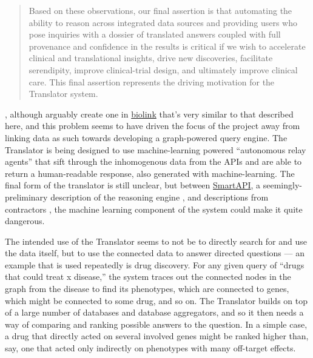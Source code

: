 \documentclass[10pt]{article}
\begin{document}
\begin{multicols}{2}
{\begin{quote}
  Based on these observations, our final assertion is that automating
  the ability to reason across integrated data sources and providing
  users who pose inquiries with a dossier of translated answers coupled
  with full provenance and confidence in the results is critical if we
  wish to accelerate clinical and translational insights, drive new
  discoveries, facilitate serendipity, improve clinical-trial design,
  and ultimately improve clinical care. This final assertion represents
  the driving motivation for the Translator system. \cite{consortiumUniversalBiomedicalData2019} 
  \end{quote}}\cite{consortiumUniversalBiomedicalData2019} ,
although arguably create one in
\href{https://biolink.github.io/biolink-model/docs/}{biolink} that's
very similar to that described here, and this problem seems to have
driven the focus of the project away from linking data as such towards
developing a graph-powered query engine. The Translator is being
designed to use machine-learning powered ``autonomous relay agents''
that sift through the inhomogenous data from the APIs and are able to
return a human-readable response, also generated with machine-learning.
The final form of the translator is still unclear, but between
\href{https://smart-api.info/portal/translator}{SmartAPI}, a
seemingly-preliminary description of the reasoning engine \cite{goelExplanationContainerCaseBased2021} , and descriptions from
contractors \cite{ROBOKOPCoVar2021} , the machine learning
component of the system could make it quite dangerous.

The intended use of the Translator seems to not be to directly search
for and use the data itself, but to use the connected data to answer
directed questions \cite{goelExplanationContainerCaseBased2021} 
--- an example that is used repeatedly is drug discovery. For any given
query of ``drugs that could treat x disease,'' the system traces out the
connected nodes in the graph from the disease to find its phenotypes,
which are connected to genes, which might be connected to some drug, and
so on. The Translator builds on top of a large number of databases and
database aggregators, and so it then needs a way of comparing and
ranking possible answers to the question. In a simple case, a drug that
directly acted on several involved genes might be ranked higher than,
say, one that acted only indirectly on phenotypes with many off-target
effects.


\end{multicols}
\end{document}
